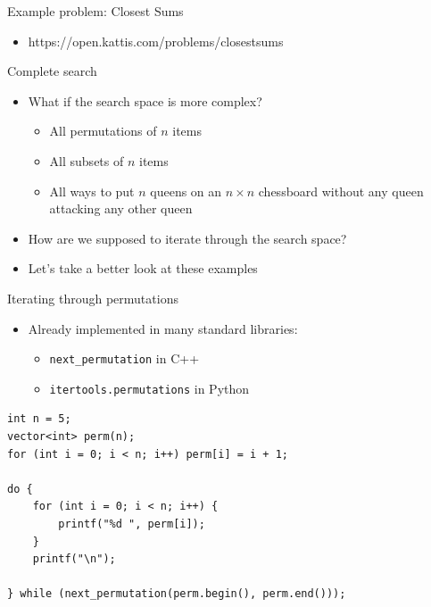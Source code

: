 \documentclass{beamer}
\begin{document}
\begin{frame}[plain]{Example problem: Closest Sums}
    \begin{itemize}
        \item https://open.kattis.com/problems/closestsums
    \end{itemize}
\end{frame}

\begin{frame}[plain]{Complete search}
    \begin{itemize}
        \item What if the search space is more complex?
            \begin{itemize}
                \item All permutations of $n$ items
                \item All subsets of $n$ items
                \item All ways to put $n$ queens on an $n\times n$ chessboard without any queen attacking any other queen
            \end{itemize}
        \item How are we supposed to iterate through the search space?
        \item Let's take a better look at these examples
    \end{itemize}
\end{frame}

\begin{frame}{Iterating through permutations}
    \begin{itemize}
        \item Already implemented in many standard libraries:
            \begin{itemize}
                \item \texttt{next\_{}permutation} in C++
                \item \texttt{itertools.permutations} in Python
            \end{itemize}
    \end{itemize}

            \begin{verbatim}
int n = 5;
vector<int> perm(n);
for (int i = 0; i < n; i++) perm[i] = i + 1;

do {
    for (int i = 0; i < n; i++) {
        printf("%d ", perm[i]);
    }
    printf("\n");

} while (next_permutation(perm.begin(), perm.end()));
            \end{verbatim}

\end{frame}
\end{document}
